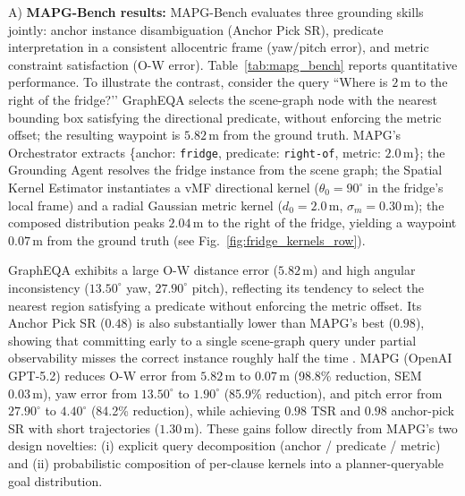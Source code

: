 \noindent A) \textbf{MAPG-Bench results:}
MAPG-Bench evaluates three grounding skills jointly: anchor instance disambiguation (Anchor Pick SR), predicate interpretation in a consistent allocentric frame (yaw/pitch error), and metric constraint satisfaction (O-W error). Table~\ref{tab:mapg_bench} reports quantitative performance. To illustrate the contrast, consider the query ``Where is $2\,\mathrm{m}$ to the right of the fridge?’’ GraphEQA selects the scene-graph node with the nearest bounding box satisfying the directional predicate, without enforcing the metric offset; the resulting waypoint is $5.82\,\mathrm{m}$ from the ground truth. MAPG’s Orchestrator extracts \{anchor: \texttt{fridge}, predicate: \texttt{right-of}, metric: $2.0\,\mathrm{m}$\}; the Grounding Agent resolves the fridge instance from the scene graph; the Spatial Kernel Estimator instantiates a vMF directional kernel ($\theta_0 = 90^\circ$ in the fridge’s local frame) and a radial Gaussian metric kernel ($d_0 = 2.0\,\mathrm{m}$, $\sigma_m = 0.30\,\mathrm{m}$); the composed distribution peaks $2.04\,\mathrm{m}$ to the right of the fridge, yielding a waypoint $0.07\,\mathrm{m}$ from the ground truth (see Fig.~\ref{fig:fridge_kernels_row}).

GraphEQA exhibits a large O-W distance error ($5.82\,\mathrm{m}$) and high angular inconsistency ($13.50^\circ$ yaw, $27.90^\circ$ pitch), reflecting its tendency to select the nearest region satisfying a predicate without enforcing the metric offset. Its Anchor Pick SR ($0.48$) is also substantially lower than MAPG’s best ($0.98$), showing that committing early to a single scene-graph query under partial observability misses the correct instance roughly half the time . MAPG (OpenAI GPT-5.2) reduces O-W error from $5.82\,\mathrm{m}$ to $0.07\,\mathrm{m}$ (98.8\% reduction, SEM $0.03\,\mathrm{m}$), yaw error from $13.50^\circ$ to $1.90^\circ$ (85.9\% reduction), and pitch error from $27.90^\circ$ to $4.40^\circ$ (84.2\% reduction), while achieving $0.98$ TSR and $0.98$ anchor-pick SR with short trajectories ($1.30\,\mathrm{m}$). These gains follow directly from MAPG’s two design novelties: (i) explicit query decomposition (anchor / predicate / metric) and (ii) probabilistic composition of per-clause kernels into a planner-queryable goal distribution. 

